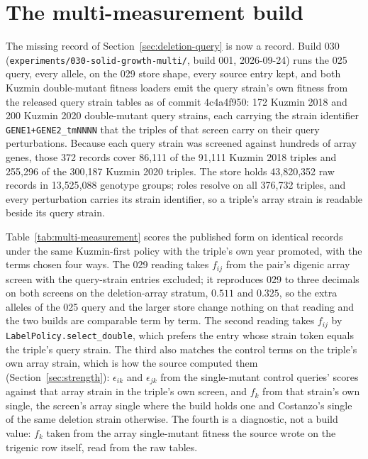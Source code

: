 
\section{The multi-measurement build}
\label{sec:multi-measurement}

The missing record of Section~\ref{sec:deletion-query} is now a record. Build 030
(\texttt{experiments/030-solid-growth-multi/}, build 001, 2026-09-24) runs the 025 query,
every allele, on the 029 store shape, every source entry kept, and both Kuzmin
double-mutant fitness loaders emit the query strain's own fitness from the released query
strain tables as of commit 4c4a4f950: 172 Kuzmin 2018 and 200 Kuzmin 2020 double-mutant
query strains, each carrying the strain identifier \texttt{GENE1+GENE2\_tmNNNN} that the
triples of that screen carry on their query perturbations. Because each query strain was
screened against hundreds of array genes, those 372 records cover 86{,}111 of the 91{,}111
Kuzmin 2018 triples and 255{,}296 of the 300{,}187 Kuzmin 2020 triples. The store holds
43{,}820{,}352 raw records in 13{,}525{,}088 genotype groups; roles resolve on all
376{,}732 triples, and every perturbation carries its strain identifier, so a triple's
array strain is readable beside its query strain.

Table~\ref{tab:multi-measurement} scores the published form on identical records under
the same Kuzmin-first policy with the triple's own year promoted, with the terms chosen
four ways. The 029 reading takes $f_{ij}$ from the pair's digenic array screen with the
query-strain entries excluded; it reproduces 029 to three decimals on both screens on
the deletion-array stratum, $0.511$ and $0.325$, so the extra alleles of the 025 query
and the larger store change nothing on that reading and the two builds are comparable
term by term. The second reading takes $f_{ij}$ by
\texttt{LabelPolicy.select\_double}, which prefers the entry whose strain token equals
the triple's query strain. The third also matches the control terms on the triple's
own array strain, which is how the source computed them (Section~\ref{sec:strength}):
$\epsilon_{ik}$ and $\epsilon_{jk}$ from the single-mutant control queries' scores
against that array strain in the triple's own screen, and $f_k$ from that strain's own
single, the screen's array single where the build holds one and Costanzo's single of the
same deletion strain otherwise. The fourth is a diagnostic, not a build value: $f_k$
taken from the array single-mutant fitness the source wrote on the trigenic row itself,
read from the raw tables.

